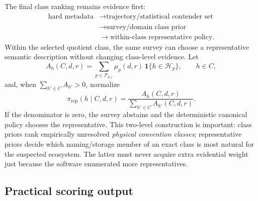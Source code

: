 \documentclass[11pt]{article}
\begin{document}
    The final class ranking remains evidence first:
    \begin{equation}
        \boxed{\begin{aligned}
                   \text{hard metadata}
                   &\longrightarrow \text{trajectory/statistical contender set} \\
                   &\longrightarrow \text{survey/domain class prior} \\
                   &\longrightarrow \text{within-class representative policy}.
        \end{aligned}}
        \label{eq:survey-ranking-hierarchy}
    \end{equation}
    Within the selected quotient class, the same survey can choose a representative
    semantic description without changing class-level evidence. Let
    \begin{equation}
        A_h(C,d,r)
        =\sum_{p\in\mathcal P_{d,r}}
        \mu_p(d,r)\,\mathbf 1\{h\in\mathcal H_p\},
        \qquad h\in C,
    \end{equation}
    and, when $\sum_{h'\in C}A_{h'}>0$, normalize
    \begin{equation}
        \pi_{\mathrm{rep}}(h\mid C,d,r)
        =\frac{A_h(C,d,r)}{\sum_{h'\in C}A_{h'}(C,d,r)}.
        \label{eq:survey-representative-prior}
    \end{equation}
    If the denominator is zero, the survey abstains and the deterministic canonical policy
    chooses the representative. This two-level construction is important: class priors rank empirically unresolved
    \emph{physical convention classes}; representative priors decide which naming/storage
    member of an exact class is most natural for the suspected ecosystem. The latter must
    never acquire extra evidential weight just because the software enumerated more
    representatives.

    \subsection{Practical scoring output}
\end{document}
